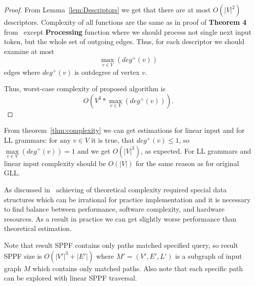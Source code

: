 \begin{proof}

From Lemma~\ref{lem:Descriptors} we get that there are at most $O(|V|^2)$ descriptors. 
Complexity of all functions are the same as in proof of \textbf{Theorem 4} from~\cite{gllParsingTree} except \textbf{Processing} function where we should process not single next input token, but the whole set of outgoing edges.
Thus, for each descriptor we should examine at most $$\max\limits_{v \in V}\left(deg^+\left(v\right)\right)$$ edges where $deg^+(v)$ is outdegree of vertex $v$.

Thus, worst-case complexity of proposed algorithm is $$O\left(V^3*\max\limits_{v \in V}\left(deg^+\left(v\right)\right)\right).$$
\end{proof}


From theorem~\ref{thm:complexity} we can get estimations for linear input and for LL grammars: $\text{for any } v \in V$ it is true, that $deg^+(v) \leq 1$, so $\max\limits_{v \in V}(deg^+(v))  = 1 $ and we get $O(|V|^3)$, as expected. 
For LL grammars and linear input complexity should be $O(|V|)$ for the same reason as for original GLL.
 

As discussed in~\cite{modellingGLL} achieving of theoretical complexity required special data structures which can be irrational for practice implementation and it is necessary to find balance between performance, software complexity, and hardware resources.
As a result in practice we can get slightly worse performance than theoretical estimation.

Note that result SPPF contains only paths matched specified query, so result SPPF size is $O(|V'|^3 + |E'|)$ where $M'=(V',E',L')$ is a subgraph of input graph $M$ which contains only matched paths.
Also note that each specific path can be explored with linear SPPF traversal. 
